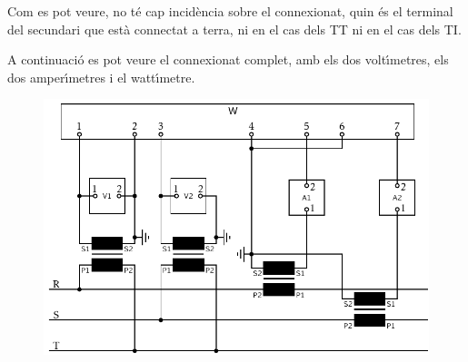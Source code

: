 \begin{exemple}
Com es pot veure, no t\'{e} cap incid\`{e}ncia sobre el connexionat, quin \'{e}s
el terminal del secundari que est\`{a} connectat a terra, ni en el cas
dels TT ni en el cas dels TI.

A continuaci\'{o} es pot veure el connexionat complet, amb els dos
volt\'{\i}metres, els dos amper\'{\i}metres i el watt\'{\i}metre.

\begin{figure}[h]
\centering
    \includegraphics{Imatges/Cap-TrafosMesProt-Instal-Watt.pdf}
\end{figure}

\end{exemple}
